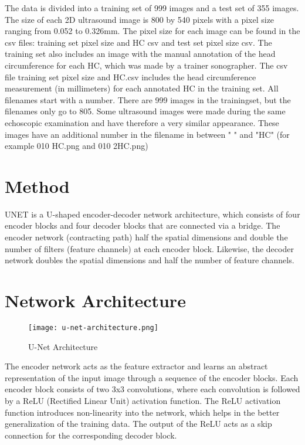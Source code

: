 \documentclass[twocolumn]{article}
\begin{document}
The data is divided into a training set of 999 images and a test set of 355 images. The size of each 2D ultrasound image is 800 by 540 pixels with a pixel size ranging from 0.052 to 0.326mm. The pixel size for each image can be found in the csv files: training set pixel size and HC csv and test set pixel size csv. The training set also includes an image with the manual annotation of the head circumference for each HC, which was made by a trainer sonographer. The csv file training set pixel size and HC.csv includes the head circumference measurement (in millimeters) for each annotated HC in the training set. All filenames start with a number. There are 999 images in the trainingset, but the filenames only go to 805. Some ultrasound images were made during the same echoscopic examination and have therefore a very similar appearance. These images have an additional number in the filename in between " " and "HC" (for example 010 HC.png and 010 2HC.png) 

\section{Method}
UNET is a U-shaped encoder-decoder network architecture, which consists of four encoder blocks and four decoder blocks that are connected via a bridge. The encoder network (contracting path) half the spatial dimensions and double the number of filters (feature channels) at each encoder block. Likewise, the decoder network doubles the spatial dimensions and half the number of feature channels.

\section{Network Architecture}
\begin{figure}
    \centering
    \texttt{[image: u-net-architecture.png]}
    \caption{U-Net Architecture}
    \label{fig:unet}
\end{figure}

The encoder network acts as the feature extractor and learns an abstract representation of the input image through a sequence of the encoder blocks. Each encoder block consists of two 3x3 convolutions, where each convolution is followed by a ReLU (Rectified Linear Unit) activation function. The ReLU activation function introduces non-linearity into the network, which helps in the better generalization of the training data. The output of the ReLU acts as a skip connection for the corresponding decoder block.
\end{document}
